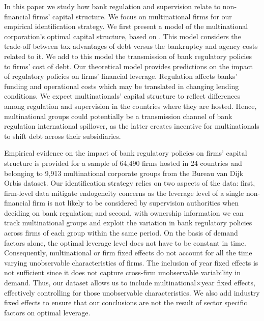 \documentclass[12pt]{article}
\begin{document}
	In this paper we study how bank regulation and supervision relate to non-financial firms' capital structure. We focus on multinational firms for our empirical identification strategy. We first present a model of the multinational corporation's optimal capital structure, based on \cite*{huizinga2008capital}. This model considers the trade-off between tax advantages of debt versus the bankruptcy and agency costs related to it. We add to this model the transmission of bank regulatory policies to firms' cost of debt. Our theoretical model provides predictions on the impact of regulatory policies on firms' financial leverage. Regulation affects banks' funding and operational costs which may be translated in changing lending conditions. We expect multinationals' capital structure to reflect differences among regulation and supervision in the countries where they are hosted. Hence, multinational groups could potentially be a transmission channel of bank regulation international spillover, as the latter creates incentive for multinationals to shift debt across their subsidiaries. 
	
	Empirical evidence on the impact of bank regulatory policies on firms' capital structure is provided for a sample of 64,490 firms hosted in 24 countries and belonging to 9,913 multinational corporate groups from the Bureau van Dijk Orbis dataset. Our identification strategy relies on two aspects of the data: first, firm-level data mitigate endogeneity concerns as the leverage level of a single non-financial firm is not likely to be considered by supervision authorities when deciding on bank regulation; and second, with ownership information we can track multinational groups and exploit the variation in bank regulatory policies across firms of each group within the same period. On the basis of demand factors alone, the optimal leverage level does not have to be constant in time. Consequently, multinational or firm fixed effects do not account for all the time varying unobservable characteristics of firms. The inclusion of year fixed effects is not sufficient since it does not capture cross-firm unobservable variability in demand. Thus, our dataset allows us to include multinational$\times$year fixed effects, effectively controlling for those unobservable characteristics. We also add industry fixed effects to ensure that our conclusions are not the result of sector specific factors on optimal leverage. 
	
\end{document}
